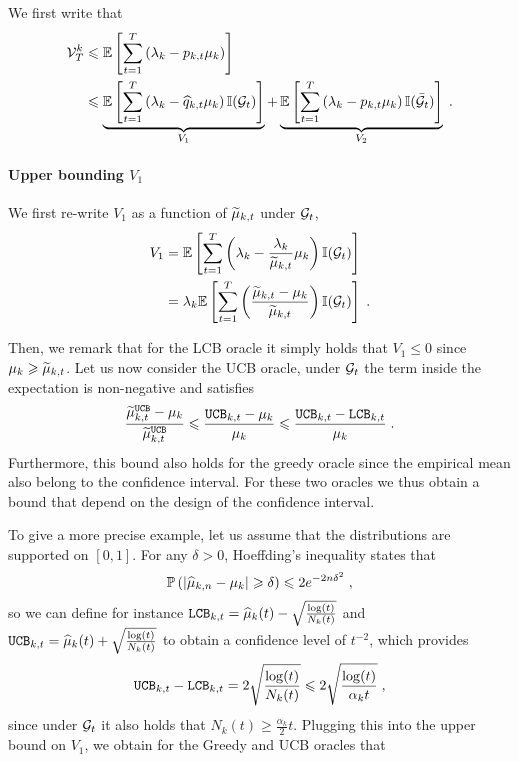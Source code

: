 We first write that 
\begin{align*}
\mathcal{V}_T^k &\leqslant \mathbb{E}\left[\sum_{t=1}^T \left(\lambda_k-p_{k, t} \mu_k \right)\right] \\
&
\leqslant  \underbrace{\mathbb{E}\left[\sum_{t=1}^T \left(\lambda_k-\widehat{q}_{k,t} \mu_k \right) \mathbb{I}(\mathcal{G}_t)\right]}_{V_1} + \underbrace{\mathbb{E}\left[\sum_{t=1}^T \left(\lambda_k-p_{k, t} \mu_k \right) \mathbb{I}(\bar {\mathcal{G}}_t)\right]}_{V_2} \;. \\
\end{align*}

\paragraph{Upper bounding $V_1$} We first re-write $V_1$ as a function of $\widetilde{\mu}_{k, t}$ under $\mathcal{G}_t$, 
\begin{align*}
V_1 & = \mathbb{E}\left[\sum_{t=1}^T \left(\lambda_k- \frac{\lambda_k}{\widetilde{\mu}_{k, t}} \mu_k \right) \mathbb{I}(\mathcal{G}_t)\right] \\
& = \lambda_k \mathbb{E}\left[\sum_{t=1}^T \left(\frac{\widetilde{\mu}_{k,t}-\mu_k}{\widetilde{\mu}_{k,t}}\right) \mathbb{I}(\mathcal{G}_t)\right]\;.
\end{align*}

Then, we remark that for the LCB oracle it simply holds that $V_1\leq 0$ since $\mu_k\geqslant \widetilde{\mu}_{k,t}$. Let us now consider the UCB oracle, under $\mathcal{G}_t$ the term inside the expectation is non-negative and satisfies 
\[\frac{\widetilde{\mu}_{k,t}^{\texttt{UCB}}-\mu_k}{\widetilde{\mu}_{k,t}^{\texttt{UCB}}} \leqslant \frac{\texttt{UCB}_{k,t}-\mu_k}{\mu_k} \leqslant \frac{\texttt{UCB}_{k,t}-\texttt{LCB}_{k, t}}{\mu_k} \;. \]
Furthermore, this bound also holds for the greedy oracle since the empirical mean also belong to the confidence interval. For these two oracles we thus obtain a bound that depend on the design of the confidence interval. 

To give a more precise example, let us assume that the distributions are supported on $[0,1]$. For any $\delta>0$, Hoeffding's inequality states that 
\[\mathbb{P}\left(|\widehat{\mu}_{k, n}-\mu_k|\geqslant \delta \right)\leqslant 2e^{-2n\delta^2}\;, \]
so we can define for instance $\texttt{LCB}_{k,t} = \widehat{\mu}_k(t) - \sqrt{\frac{\log(t)}{N_k(t)}} $ and $\texttt{UCB}_{k,t} = \widehat{\mu}_k(t) + \sqrt{\frac{\log(t)}{N_k(t)}}$ to obtain a confidence level of $t^{-2}$, which provides \[\texttt{UCB}_{k,t}-\texttt{LCB}_{k, t} = 2\sqrt{\frac{\log(t)}{N_k(t)}} \leqslant 2\sqrt{\frac{\log(t)}{\alpha_k t}} \;, \]
since under $\mathcal{G}_t$ it also holds that $N_k(t)\geq \frac{\alpha_k}{2}t$. Plugging this into the upper bound on $V_1$, we obtain for the Greedy and UCB oracles that 

